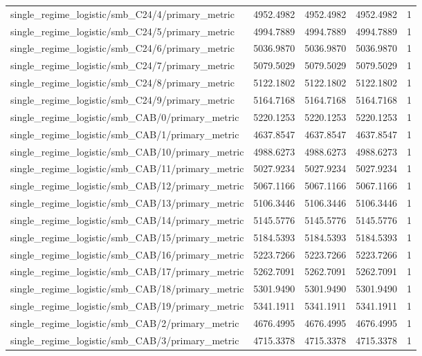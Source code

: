 \begin{table}[h]
\begin{tabular}{lrrrr}
single_regime_logistic/smb_C24/4/primary_metric & 4952.4982 & 4952.4982 & 4952.4982 & 1 \\
single_regime_logistic/smb_C24/5/primary_metric & 4994.7889 & 4994.7889 & 4994.7889 & 1 \\
single_regime_logistic/smb_C24/6/primary_metric & 5036.9870 & 5036.9870 & 5036.9870 & 1 \\
single_regime_logistic/smb_C24/7/primary_metric & 5079.5029 & 5079.5029 & 5079.5029 & 1 \\
single_regime_logistic/smb_C24/8/primary_metric & 5122.1802 & 5122.1802 & 5122.1802 & 1 \\
single_regime_logistic/smb_C24/9/primary_metric & 5164.7168 & 5164.7168 & 5164.7168 & 1 \\
single_regime_logistic/smb_CAB/0/primary_metric & 5220.1253 & 5220.1253 & 5220.1253 & 1 \\
single_regime_logistic/smb_CAB/1/primary_metric & 4637.8547 & 4637.8547 & 4637.8547 & 1 \\
single_regime_logistic/smb_CAB/10/primary_metric & 4988.6273 & 4988.6273 & 4988.6273 & 1 \\
single_regime_logistic/smb_CAB/11/primary_metric & 5027.9234 & 5027.9234 & 5027.9234 & 1 \\
single_regime_logistic/smb_CAB/12/primary_metric & 5067.1166 & 5067.1166 & 5067.1166 & 1 \\
single_regime_logistic/smb_CAB/13/primary_metric & 5106.3446 & 5106.3446 & 5106.3446 & 1 \\
single_regime_logistic/smb_CAB/14/primary_metric & 5145.5776 & 5145.5776 & 5145.5776 & 1 \\
single_regime_logistic/smb_CAB/15/primary_metric & 5184.5393 & 5184.5393 & 5184.5393 & 1 \\
single_regime_logistic/smb_CAB/16/primary_metric & 5223.7266 & 5223.7266 & 5223.7266 & 1 \\
single_regime_logistic/smb_CAB/17/primary_metric & 5262.7091 & 5262.7091 & 5262.7091 & 1 \\
single_regime_logistic/smb_CAB/18/primary_metric & 5301.9490 & 5301.9490 & 5301.9490 & 1 \\
single_regime_logistic/smb_CAB/19/primary_metric & 5341.1911 & 5341.1911 & 5341.1911 & 1 \\
single_regime_logistic/smb_CAB/2/primary_metric & 4676.4995 & 4676.4995 & 4676.4995 & 1 \\
single_regime_logistic/smb_CAB/3/primary_metric & 4715.3378 & 4715.3378 & 4715.3378 & 1 \\

\end{tabular}
\end{table}
